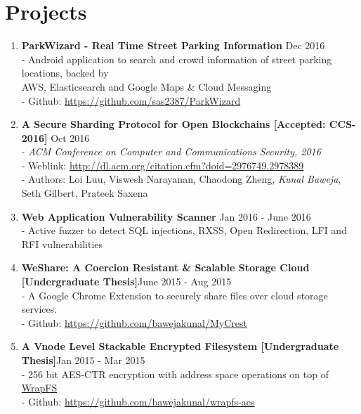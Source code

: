 \documentclass{article}
\begin{document}
\section*{Projects}
\begin{enumerate}

    \item \textbf{ParkWizard - Real Time Street Parking Information} {\hfill Dec 2016}\\
    - Android application to search and crowd information of street parking locations, backed by\\
    \hspace*{0.7em}AWS, Elasticsearch and Google Maps \& Cloud Messaging\\
    - Github: \href{https://github.com/sas2387/ParkWizard}{https://github.com/sas2387/ParkWizard}

    \item \textbf{A Secure Sharding Protocol for Open Blockchains [Accepted: CCS-2016]} {\hfill Oct 2016}\\
    - \textit{ACM Conference on Computer and Communications Security, 2016}\\
    - Weblink: \href{http://dl.acm.org/citation.cfm?doid=2976749.2978389}{http://dl.acm.org/citation.cfm?doid=2976749.2978389}\\
    - Authors: Loi Luu, Viswesh Narayanan, Chaodong Zheng, \textit{Kunal Baweja}, Seth Gilbert, Prateek Saxena

    \item \textbf{Web Application Vulnerability Scanner} {\hfill Jan 2016 - June 2016}\\
    - Active fuzzer to detect SQL injections, RXSS, Open Redirection, LFI and RFI vulnerabilities 

    \item \textbf{WeShare: A Coercion Resistant \& Scalable Storage Cloud [Undergraduate Thesis]}{\hfill June 2015 - Aug 2015}\\
    - A Google Chrome Extension to securely share files over cloud storage services.\\
    - Github: \href{https://github.com/bawejakunal/MyCrest}{https://github.com/bawejakunal/MyCrest}

    \item \textbf{A Vnode Level Stackable Encrypted Filesystem [Undergraduate Thesis]}{\hfill Jan 2015 - Mar 2015}\\
    - 256 bit AES-CTR encryption with address space operations on top of \href{http://wrapfs.filesystems.org/}{WrapFS}\\
    - Github: \href{https://github.com/bawejakunal/wrapfs-aes}{https://github.com/bawejakunal/wrapfs-aes}
    

\end{enumerate}
\end{document}
